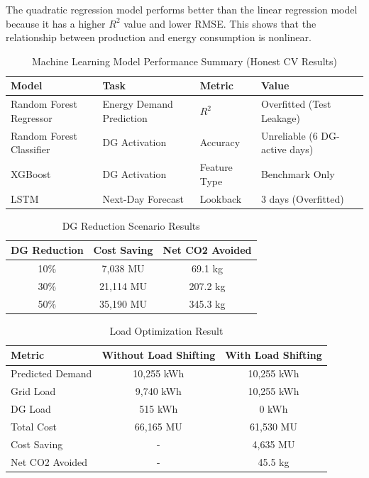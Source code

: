 The quadratic regression model performs better than the linear regression model because it has a higher $R^2$ value and lower RMSE. This shows that the relationship between production and energy consumption is nonlinear.

\begin{table}[htbp]
\centering
\caption{Machine Learning Model Performance Summary (Honest CV Results)}
\label{tab:ml_perf}
\begin{tabular}{|l|p{4cm}|p{3cm}|p{4cm}|}
\hline
\textbf{Model} & \textbf{Task} & \textbf{Metric} & \textbf{Value} \\
\hline
Random Forest Regressor & Energy Demand Prediction & $R^2$ & Overfitted (Test Leakage) \\
Random Forest Classifier & DG Activation & Accuracy & Unreliable (6 DG-active days) \\
XGBoost & DG Activation & Feature Type & Benchmark Only \\
LSTM & Next-Day Forecast & Lookback & 3 days (Overfitted) \\
\hline
\end{tabular}
\end{table}

\begin{table}[htbp]
\centering
\caption{DG Reduction Scenario Results}
\label{tab:dg_reduction}
\begin{tabular}{|c|c|c|}
\hline
\textbf{DG Reduction} & \textbf{Cost Saving} & \textbf{Net CO2 Avoided} \\
\hline
10\% & 7,038 MU & 69.1 kg \\
30\% & 21,114 MU & 207.2 kg \\
50\% & 35,190 MU & 345.3 kg \\
\hline
\end{tabular}
\end{table}

\begin{table}[htbp]
\centering
\caption{Load Optimization Result}
\label{tab:load_optimization}
\begin{tabular}{|l|c|c|}
\hline
\textbf{Metric} & \textbf{Without Load Shifting} & \textbf{With Load Shifting} \\
\hline
Predicted Demand & 10,255 kWh & 10,255 kWh \\
Grid Load & 9,740 kWh & 10,255 kWh \\
DG Load & 515 kWh & 0 kWh \\
Total Cost & 66,165 MU & 61,530 MU \\
Cost Saving & - & 4,635 MU \\
Net CO2 Avoided & - & 45.5 kg \\
\hline
\end{tabular}
\end{table}

